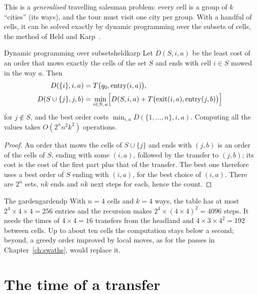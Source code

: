 This is a \emph{generalised} travelling salesman problem: every cell is a
group of $k$ ``cities'' (its ways), and the tour must visit one city per
group. With a handful of cells, it can be solved exactly by dynamic
programming over the subsets of cells, the method of Held and
Karp~\cite{held1962dynamic}.

\begin{proposition}{Dynamic programming over subsets}{heldkarp}
  Let $D(S, i, a)$ be the least cost of an order that mows exactly the
  cells of the set $S$ and ends with cell $i \in S$ mowed in the way $a$.
  Then
  \begin{align*}
    D(\{i\}, i, a) &= T\bigl(q_0, \mathrm{entry}(i, a)\bigr), \\
    D(S \cup \{j\}, j, b) &= \min_{i \in S,\, a}
      \Bigl[ D(S, i, a) + T\bigl(\mathrm{exit}(i, a),
      \mathrm{entry}(j, b)\bigr) \Bigr]
  \end{align*}
  for $j \notin S$, and the best order costs $\min_{i, a} D(\{1, \dots,
  n\}, i, a)$. Computing all the values takes $O(2^n n^2 k^2)$ operations.
\end{proposition}

\begin{proof}
  An order that mows the cells of $S \cup \{j\}$ and ends with $(j, b)$
  is an order of the cells of $S$, ending with some $(i, a)$, followed by
  the transfer to $(j, b)$; its cost is the cost of the first part plus that
  of the transfer. The best one therefore uses a best order of $S$ ending
  with $(i, a)$, for the best choice of $(i, a)$. There are $2^n$ sets, $n
  k$ ends and $n k$ next steps for each, hence the count.
\end{proof}

\begin{example}{The garden}{gardendp}
  With $n = 4$ cells and $k = 4$ ways, the table has at most $2^4 \times 4
  \times 4 = 256$ entries and the recursion makes $2^4 \times (4 \times
  4)^2 = 4096$ steps. It needs the times of $4 \times 4 = 16$ transfers
  from the headland and $4 \times 3 \times 4^2 = 192$ between cells. Up to
  about ten cells the computation stays below a second; beyond, a greedy
  order improved by local moves, as for the passes in
  Chapter~\ref{ch:swaths}, would replace it.
\end{example}

\section{The time of a transfer}

